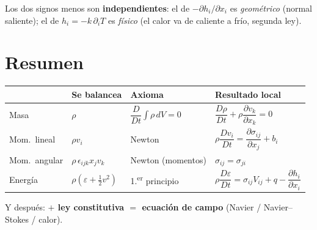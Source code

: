 \documentclass[11pt,a4paper]{article}
\begin{document}
\medskip
\noindent Los dos signos menos son \textbf{independientes}: el de
$-\partial h_i/\partial x_i$ es \emph{geométrico} (normal saliente); el de
$h_i=-k\,\partial_i T$ es \emph{físico} (el calor va de caliente a frío, segunda ley).

\section*{Resumen}

\begin{center}
\begin{tabular}{@{}llll@{}}
\hline
 & Se balancea & Axioma & Resultado local \\
\hline
Masa & $\rho$ & $\dfrac{D}{Dt}\displaystyle\int\rho\,dV=0$
     & $\dfrac{D\rho}{Dt}+\rho\dfrac{\partial v_k}{\partial x_k}=0$ \\[2ex]
Mom.\ lineal & $\rho v_i$ & Newton
     & $\rho\dfrac{Dv_i}{Dt}=\dfrac{\partial\sigma_{ij}}{\partial x_j}+b_i$ \\[2ex]
Mom.\ angular & $\rho\,\epsilon_{ijk}x_jv_k$ & Newton (momentos)
     & $\sigma_{ij}=\sigma_{ji}$ \\[2ex]
Energía & $\rho(\varepsilon+\tfrac12 v^2)$ & 1.\textsuperscript{er} principio
     & $\rho\dfrac{D\varepsilon}{Dt}=\sigma_{ij}V_{ij}+q-\dfrac{\partial h_i}{\partial x_i}$ \\
\hline
\end{tabular}
\end{center}

\vspace{1em}
\noindent Y después: \textbf{$+$ ley constitutiva $=$ ecuación de campo}
(Navier / Navier--Stokes / calor).
\end{document}
